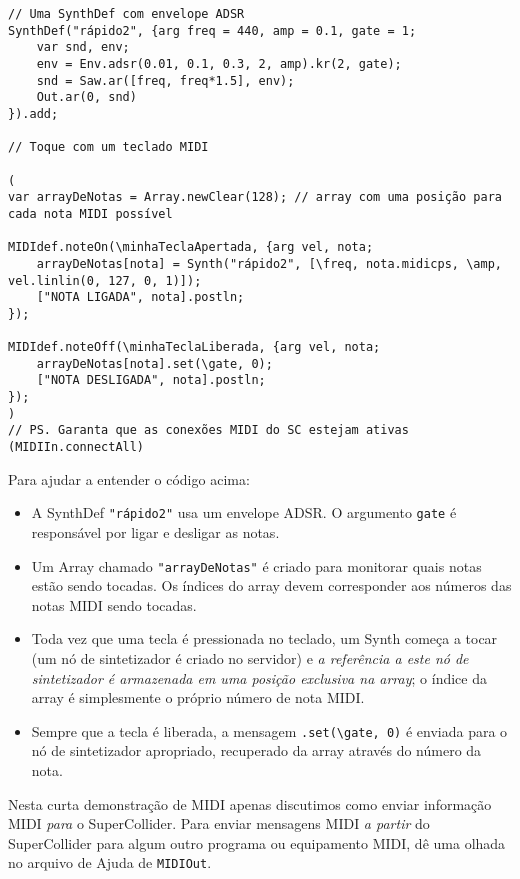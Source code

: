 \begin{lstlisting}[style=SuperCollider-IDE, basicstyle=\scttfamily\footnotesize]
 // Uma SynthDef com envelope ADSR
SynthDef("rápido2", {arg freq = 440, amp = 0.1, gate = 1;
	var snd, env;
	env = Env.adsr(0.01, 0.1, 0.3, 2, amp).kr(2, gate);
	snd = Saw.ar([freq, freq*1.5], env);	
	Out.ar(0, snd)
}).add;

// Toque com um teclado MIDI

(
var arrayDeNotas = Array.newClear(128); // array com uma posição para cada nota MIDI possível

MIDIdef.noteOn(\minhaTeclaApertada, {arg vel, nota;
	arrayDeNotas[nota] = Synth("rápido2", [\freq, nota.midicps, \amp, vel.linlin(0, 127, 0, 1)]);
	["NOTA LIGADA", nota].postln;
});
	
MIDIdef.noteOff(\minhaTeclaLiberada, {arg vel, nota;
	arrayDeNotas[nota].set(\gate, 0);
	["NOTA DESLIGADA", nota].postln;
});
)
// PS. Garanta que as conexões MIDI do SC estejam ativas (MIDIIn.connectAll)
 \end{lstlisting} 
 
Para ajudar a entender o código acima:

\begin{itemize}
\item A SynthDef \texttt{"rápido2"} usa um envelope ADSR. O argumento \texttt{gate} é responsável por ligar e desligar as notas.
\item Um Array chamado \texttt{"arrayDeNotas"} é criado para monitorar quais notas estão sendo tocadas. Os índices do array devem corresponder aos números das notas MIDI sendo tocadas.
\item Toda vez que uma tecla é pressionada no teclado, um Synth começa a tocar (um nó de sintetizador é criado no servidor) e \emph{a referência a este nó de sintetizador é armazenada em uma posição exclusiva na array}; o índice da array é simplesmente o próprio número de nota MIDI.
\item Sempre que a tecla é liberada, a mensagem \texttt{.set(\textbackslash gate, 0)} é enviada para o nó de sintetizador apropriado, recuperado da array através do número da nota.
\end{itemize}

Nesta curta demonstração de MIDI apenas discutimos como enviar informação MIDI \emph{para} o SuperCollider. Para enviar mensagens MIDI \emph{a partir} do SuperCollider para algum outro programa ou equipamento MIDI, dê uma olhada no arquivo de Ajuda de \texttt{MIDIOut}.
